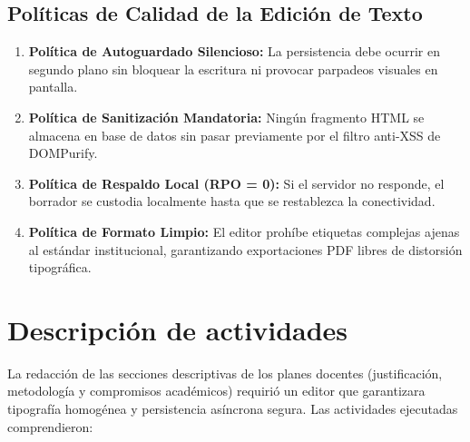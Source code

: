 \documentclass[12pt,a4paper]{article}
\begin{document}
\subsection{Políticas de Calidad de la Edición de Texto}
\begin{enumerate}[leftmargin=1.5em, itemsep=2pt]
    \item \textbf{Política de Autoguardado Silencioso:} La persistencia debe ocurrir en segundo plano sin bloquear la escritura ni provocar parpadeos visuales en pantalla.
    \item \textbf{Política de Sanitización Mandatoria:} Ningún fragmento HTML se almacena en base de datos sin pasar previamente por el filtro anti-XSS de DOMPurify.
    \item \textbf{Política de Respaldo Local (RPO = 0):} Si el servidor no responde, el borrador se custodia localmente hasta que se restablezca la conectividad.
    \item \textbf{Política de Formato Limpio:} El editor prohíbe etiquetas complejas ajenas al estándar institucional, garantizando exportaciones PDF libres de distorsión tipográfica.
\end{enumerate}

\section{Descripción de actividades}
La redacción de las secciones descriptivas de los planes docentes (justificación, metodología y compromisos académicos) requirió un editor que garantizara tipografía homogénea y persistencia asíncrona segura. Las actividades ejecutadas comprendieron:
\end{document}
